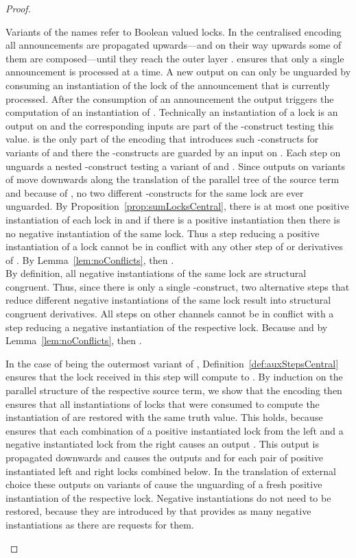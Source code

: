 \documentclass[]{eptcs}
\begin{document}
\begin{proof}
\begin{compactenum}
		\item Variants of the names  refer to Boolean valued locks. In the centralised encoding all announcements are propagated upwards---and on their way upwards some of them are composed---until they reach the outer layer .  ensures that only a single announcement is processed at a time. A new output on  can only be unguarded by consuming an instantiation of the lock  of the announcement that is currently processed. After the consumption of an announcement the output  triggers the computation of an instantiation of . Technically an instantiation of a lock is an output on  and the corresponding inputs are part of the -construct testing this value.  is the only part of the encoding that introduces such -constructs for variants of  and there the -constructs are guarded by an input on . Each step on  unguards a nested -construct testing a variant of  and . Since outputs on variants of  move downwards along the translation of the parallel tree of the source term and because of , no two different -constructs for the same lock are ever unguarded. By Proposition~\ref{prop:sumLocksCentral}, there is at most one positive instantiation of each lock in  and if there is a positive instantiation then there is no negative instantiation of the same lock. Thus a step reducing a positive instantiation of a lock cannot be in conflict with any other step of  or derivatives of . By Lemma~\ref{lem:noConflicts}, then .\\
			By definition, all negative instantiations of the same lock are structural congruent. Thus, since there is only a single -construct, two alternative steps that reduce different negative instantiations of the same lock result into structural congruent derivatives. All steps on other channels cannot be in conflict with a step reducing a negative instantiation of the respective lock. Because  and by Lemma~\ref{lem:noConflicts}, then .
		\item In the case of  being the outermost variant of , Definition~\ref{def:auxStepsCentral} ensures that the lock  received in this step will compute to . By induction on the parallel structure of the respective source term, we show that the encoding then ensures that all instantiations of locks that were consumed to compute the instantiation of  are restored with the same truth value. This holds, because  ensures that each combination of a positive instantiated lock from the left and a negative instantiated lock from the right causes an output . This output is propagated downwards and causes the outputs  and  for each pair of positive instantiated left and right locks combined below. In the translation of external choice these outputs on variants of  cause the unguarding of a fresh positive instantiation of the respective lock. Negative instantiations do not need to be restored, because they are introduced by  that provides as many negative instantiations as there are requests  for them.

\end{compactenum}
\end{proof}
\end{document}
